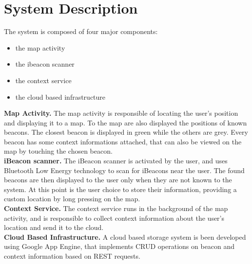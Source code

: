 \section{System Description}

The system is composed of four major components:
\begin{itemize}
\item the map activity
\item the ibeacon scanner
\item the context service
\item the cloud based infrastructure
\end{itemize}

\textbf{Map Activity.} The map activity is responsible of locating the user's position and displaying it to a map. To the map are also displayed the positions of known beacons. The closest beacon is displayed in green while the others are grey. Every beacon has some context informations attached, that can also be viewed on the map by touching the chosen beacon.\\
\textbf{iBeacon scanner.} The iBeacon scanner is activated by the user, and uses Bluetooth Low Energy technology to scan for iBeacons near the user. The found beacons are then displayed to the user only when they are not known to the system. At this point is the user choice to store their information, providing a custom location by long pressing on the map. \\
\textbf{Context Service.} The context service runs in the background of the map activity, and is responsible to collect context information about the user's location and send it to the cloud. \\
\textbf{Cloud Based Infrastructure. }  A cloud based storage system is been developed using Google App Engine, that implements CRUD operations on beacon and context information based on REST requests.

